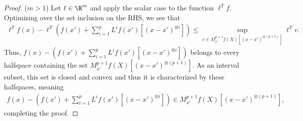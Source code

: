 \documentclass{article}
\theoremstyle{plain}
\theoremstyle{remark}
\begin{document}
\begin{proof}
($m>1$) Let $\ell\in\R^m$ and apply the scalar case to the function $\ell^T f$. Optimizing over the set inclusion on the RHS, we see that
\begin{align*}
    \ell^T f(x) - \ell^T \left(f(x') + \sum_{i=1}^p L^i f(x') [(x - x')^{\otimes i}] \right) \leq \sup_{v\in M^{p+1}_{x'} f (X)[(x - x')^{\otimes (p+1)}]} \ell^T v.
\end{align*}
Thus, $f(x) - \left(f(x') + \sum_{i=1}^p L^i f(x') [(x - x')^{\otimes i}] \right)$ belongs to every halfspace containing the set $M^{p+1}_{x'} f (X)[(x - x')^{\otimes (p+1)}]$. 
As an interval subset, this set is closed and convex and thus it is characterized by these halfspaces, meaning
\begin{align*}
    f(x) - \left(f(x') + \sum_{i=1}^p L^i f(x') [(x - x')^{\otimes i}] \right) \in M^{p+1}_{x'} f (X) [(x - x')^{\otimes (p+1)}],
\end{align*}
completing the proof.
\end{proof}

\end{document}
